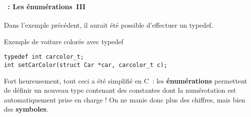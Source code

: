 \begin{frame}[containsverbatim]
  \frametitle{\secname}
  \framesubtitle{\subsecname~: Les énumérations~III} 

  Dans l'exemple précédent, il aurait été possible d'effectuer un typedef.
  \vspace{0.3cm}
  \begin{exampleblock}{Exemple de voiture colorée avec typedef}
    \begin{verbatim}
typedef int carcolor_t;
int setCarColor(struct Car *car, carcolor_t c);\end{verbatim}    
  \end{exampleblock}
  \vspace{0.3cm}
  \par
  Fort heureusement, tout ceci a été simplifié en C~: les \textbf{énumérations} permettent de définir un nouveau
  type contenant des constantes dont la numérotation est automatiquement prise en charge ! On ne manie donc plus
  des chiffres, mais bien des \textbf{symboles}.
\end{frame}

